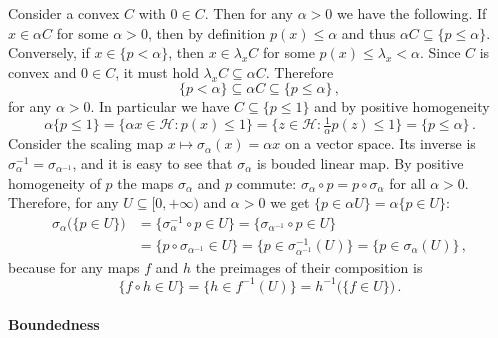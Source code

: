 \documentclass[a4paper]{article}
\newcommand{\Hcal}{\mathcal{H}}
\begin{document}
Consider a convex $C$ with $0\in C$. Then for any $\alpha > 0$ we have the following.
If $x \in \alpha C$ for some $\alpha > 0$, then by definition $p(x) \leq \alpha$ and
thus $\alpha C \subseteq \{p \leq \alpha\}$. Conversely, if $x\in \{p < \alpha\}$,
then $x \in \lambda_x C$ for some $p(x) \leq \lambda_x < \alpha$. Since $C$ is convex
and $0\in C$, it must hold $\lambda_x C \subseteq \alpha C$. Therefore
\begin{equation*}
  \{p < \alpha \}
    \subseteq \alpha C
    \subseteq \{p \leq \alpha \}
    \,,
\end{equation*}
for any $\alpha > 0$. In particular we have $C \subseteq \{p \leq 1\}$ and by positive
homogeneity
\begin{equation*}
  \alpha \{p\leq 1\}
    = \{\alpha x \in \Hcal \colon p(x) \leq 1\}
    = \bigl\{z \in \Hcal \colon \tfrac1{\alpha} p(z) \leq 1\bigr\}
    = \{p \leq \alpha\}
    \,.
\end{equation*}
Consider the scaling map $x\mapsto \sigma_\alpha(x) = \alpha x$ on a vector space.
Its inverse is $\sigma_\alpha^{-1} = \sigma_{\alpha^{-1}}$, and it is easy to see
that $\sigma_\alpha$ is bouded linear map. By positive homogeneity of $p$ the maps
$\sigma_\alpha$ and $p$ commute: $\sigma_\alpha \circ p = p \circ \sigma_\alpha$
for all $\alpha > 0$. Therefore, for any $U \subseteq [0, +\infty)$ and $\alpha > 0$
we get $\{p\in \alpha U\} = \alpha \{ p\in U \}$:
\begin{align*}
    \sigma_\alpha \bigl( \{p \in U\} \bigr)
    &= \bigl\{\sigma_\alpha^{-1} \circ p \in U\bigr\}
    = \bigl\{\sigma_{\alpha^{-1}} \circ p \in U\bigr\}
    \\
    &= \bigl\{p \circ \sigma_{\alpha^{-1}} \in U\bigr\}
    = \bigl\{p \in \sigma_{\alpha^{-1}}^{-1}(U)\bigr\}
    = \bigl\{p \in \sigma_\alpha(U)\bigr\}
    \,,
\end{align*}
because for any maps $f$ and $h$ the preimages of their composition is
\begin{equation*}
  \{f\circ h \in U\}
    = \bigl\{ h \in f^{-1}(U) \bigr\}
    = h^{-1}\bigl(\{f \in U \}\bigr)
    \,.
\end{equation*}


\paragraph{Boundedness} %
\label{par:boundedness}
\end{document}
